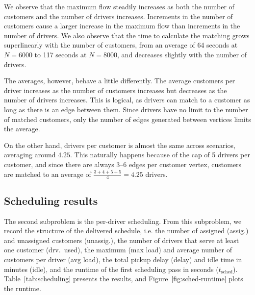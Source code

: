 We observe that the maximum flow steadily increases as both the number of customers and the number of drivers increases. Increments in the number of customers cause a larger increase in the maximum flow than increments in the number of drivers. We also observe that the time to calculate the matching grows superlinearly with the number of customers, from an average of 64 seconds at $N = 6000$ to 117 seconds at $N = 8000$, and decreases slightly with the number of drivers.

The averages, however, behave a little differently. The average customers per driver increases as the number of customers increases but decreases as the number of drivers increases. This is logical, as drivers can match to a customer as long as there is an edge between them. Since drivers have no limit to the number of matched customers, only the number of edges generated between vertices limits the average. 

On the other hand, drivers per customer is almost the same across scenarios, averaging around $4.25$. This naturally happens because of the cap of 5 drivers per customer, and since there are always 3–6 edges per customer vertex, customers are matched to an average of $\frac{3+4+5+5}{4}=4.25$ drivers.

\subsection{Scheduling results}

The second subproblem is the per-driver scheduling. From this subproblem, we record the structure of the delivered schedule, i.e. the number of assigned (assig.) and unassigned customers (unassig.), the number of drivers that serve at least one customer (drv.\ used), the maximum (max load) and average number of customers per driver (avg load), the total pickup delay (delay) and idle time in minutes (idle), and the runtime of the first scheduling pass in seconds  ($t_{\text{sched}}$). Table~\ref{tab:scheduling} presents the results, and Figure~\ref{fig:sched-runtime} plots the runtime.

